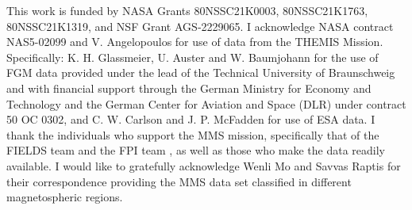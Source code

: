This work is funded by NASA Grants 80NSSC21K0003, 80NSSC21K1763, 80NSSC21K1319, and NSF Grant AGS‐2229065. I acknowledge NASA contract NAS5-02099 and V. Angelopoulos for use of data from the THEMIS Mission. Specifically: K. H. Glassmeier, U. Auster and W. Baumjohann for the use of FGM data \citep{Auster:2008} provided under the lead of the Technical University of Braunschweig and with financial support through the German Ministry for Economy and Technology and the German Center for Aviation and Space (DLR) under contract 50 OC 0302, and C. W. Carlson and J. P. McFadden for use of ESA \citep{McFadden:2008} data. I thank the individuals who support the MMS mission, specifically that of the FIELDS team \citep{Torbert:2016} and the FPI team \citep{Pollock:2016}, as well as those who make the data readily available. I would like to gratefully acknowledge Wenli Mo and Savvas Raptis for their correspondence providing the MMS data set classified in different magnetospheric regions. 


